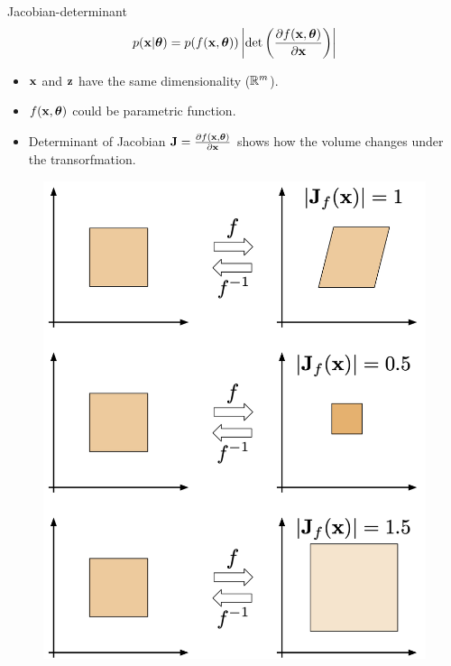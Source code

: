 \begin{frame}{Jacobian-determinant}
	\[
		p(\mathbf{x} | \boldsymbol{\theta}) = p(f(\mathbf{x}, \boldsymbol{\theta})) \left|\det \left(  \frac{\partial f(\mathbf{x},\boldsymbol{\theta})}{\partial \mathbf{x}} \right) \right| 
	\]
	\begin{minipage}{0.55\columnwidth}
		\begin{itemize}
			\item $\mathbf{x}$ and $\mathbf{z}$ have the same dimensionality ($\mathbb{R}^m$).
			\vfill
			\item $f(\mathbf{x}, \boldsymbol{\theta})$ could be parametric function.
			\vfill
			\item Determinant of Jacobian $\mathbf{J} =\frac{\partial f(\mathbf{x}, \boldsymbol{\theta})}{\partial \mathbf{x}}$ shows how the volume changes under the transorfmation.
		\end{itemize}
	\end{minipage}%
	\begin{minipage}{0.45\columnwidth}
		\begin{figure}
			\includegraphics[width=\linewidth]{figs/jacobian_det}
		\end{figure}
	\end{minipage}
\end{frame}
